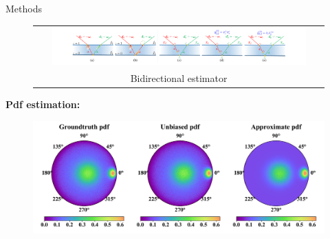 \documentclass[final]{beamer}
\newlength{\twocolwid}
\begin{document}
\begin{frame}[t]
\begin{columns}[t]
\begin{column}{\twocolwid}
\begin{block}{Methods}
            \begin{figure}
                \begin{tabular}{c}
                    \includegraphics[width=0.9\textwidth]{illustration/bidir.pdf}\\
                    \small{Bidirectional estimator}
                \end{tabular}
            \end{figure}

            \textbf{Pdf estimation:}
            \begin{figure}
            	\includegraphics[width=0.65\columnwidth]{validations/lobe_pdf/pdf.pdf}
            \end{figure}
        \end{block}
        
        \vspace{0.5cm}
        

\end{column}
\end{columns}
\end{frame}
\end{document}
